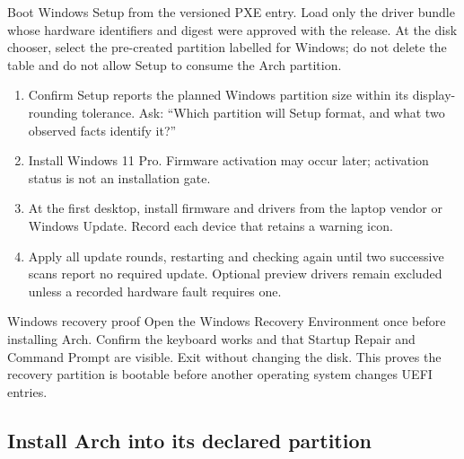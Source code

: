 Boot Windows Setup from the versioned PXE entry. Load only the driver bundle
whose hardware identifiers and digest were approved with the release. At the
disk chooser, select the pre-created partition labelled for Windows; do not
delete the table and do not allow Setup to consume the Arch partition.

\begin{enumerate}
\item Confirm Setup reports the planned Windows partition size within its
display-rounding tolerance. Ask: ``Which partition will Setup format, and what
two observed facts identify it?''
\item Install Windows 11 Pro. Firmware activation may occur later; activation
status is not an installation gate.
\item At the first desktop, install firmware and drivers from the laptop
vendor or Windows Update. Record each device that retains a warning icon.
\item Apply all update rounds, restarting and checking again until two
successive scans report no required update. Optional preview drivers remain
excluded unless a recorded hardware fault requires one.
\end{enumerate}


\begin{gate}{Windows recovery proof}
Open the Windows Recovery Environment once before installing Arch. Confirm the
keyboard works and that Startup Repair and Command Prompt are visible. Exit
without changing the disk. This proves the recovery partition is bootable
before another operating system changes UEFI entries.
\end{gate}

\subsection{Install Arch into its declared partition}

